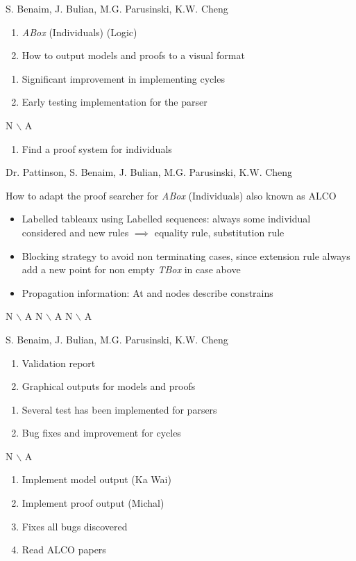 %
{S. Benaim, J. Bulian, M.G. Parusinski, K.W. Cheng}%
{\begin{enumerate}
\item \emph{ABox} (Individuals) (Logic)
\item How to output models and proofs to a visual format
\end{enumerate}
}%
{\begin{enumerate}
\item Significant improvement in implementing cycles
\item Early testing implementation for the parser
\end{enumerate}}%
{N $\backslash$ A}
{\begin{enumerate}
\item Find a proof system for individuals
\end{enumerate}}%

%
{Dr. Pattinson, S. Benaim, J. Bulian, M.G. Parusinski, K.W. Cheng}%
{How to adapt the proof searcher for \emph{ABox} (Individuals) also known as ALCO 
\begin{itemize}
\item Labelled tableaux using Labelled sequences: always some individual considered and new rules $\implies$ equality rule, substitution rule
\item Blocking strategy to avoid non terminating cases, since extension rule always add a new point for non empty \emph{TBox} in case above
\item Propagation information: At and nodes describe constrains
\end{itemize}
}%
{N $\backslash$ A}%
{N $\backslash$ A}
{N $\backslash$ A}%

%
{S. Benaim, J. Bulian, M.G. Parusinski, K.W. Cheng}%
{\begin{enumerate}
\item Validation report
\item Graphical outputs for models and proofs
\end{enumerate}
}%
{\begin{enumerate}
\item Several test has been implemented for parsers
\item Bug fixes and improvement for cycles
\end{enumerate}
}%
{{N $\backslash$ A}}
{\begin{enumerate}
\item Implement model output (Ka Wai)
\item Implement proof output (Michal)
\item Fixes all bugs discovered
\item Read ALCO papers
\end{enumerate}}%


